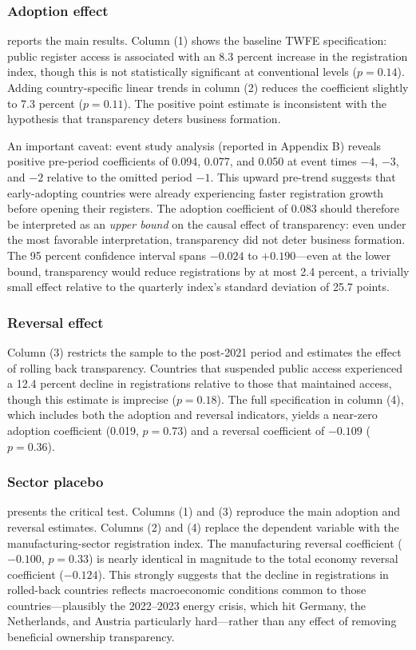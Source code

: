 \documentclass[12pt]{article}
\begin{document}


\subsubsection*{Adoption effect}  reports the main results. Column (1) shows the baseline TWFE specification: public register access is associated with an 8.3 percent increase in the registration index, though this is not statistically significant at conventional levels ($p = 0.14$). Adding country-specific linear trends in column (2) reduces the coefficient slightly to 7.3 percent ($p = 0.11$). The positive point estimate is inconsistent with the hypothesis that transparency deters business formation.

An important caveat: event study analysis (reported in Appendix B) reveals positive pre-period coefficients of 0.094, 0.077, and 0.050 at event times $-4$, $-3$, and $-2$ relative to the omitted period $-1$. This upward pre-trend suggests that early-adopting countries were already experiencing faster registration growth before opening their registers. The adoption coefficient of 0.083 should therefore be interpreted as an \textit{upper bound} on the causal effect of transparency: even under the most favorable interpretation, transparency did not deter business formation. The 95 percent confidence interval spans $-0.024$ to $+0.190$---even at the lower bound, transparency would reduce registrations by at most 2.4 percent, a trivially small effect relative to the quarterly index's standard deviation of 25.7 points.

\subsubsection*{Reversal effect} Column (3) restricts the sample to the post-2021 period and estimates the effect of rolling back transparency. Countries that suspended public access experienced a 12.4 percent decline in registrations relative to those that maintained access, though this estimate is imprecise ($p = 0.18$). The full specification in column (4), which includes both the adoption and reversal indicators, yields a near-zero adoption coefficient (0.019, $p = 0.73$) and a reversal coefficient of $-0.109$ ($p = 0.36$).

\subsubsection*{Sector placebo}  presents the critical test. Columns (1) and (3) reproduce the main adoption and reversal estimates. Columns (2) and (4) replace the dependent variable with the manufacturing-sector registration index. The manufacturing reversal coefficient ($-0.100$, $p = 0.33$) is nearly identical in magnitude to the total economy reversal coefficient ($-0.124$). This strongly suggests that the decline in registrations in rolled-back countries reflects macroeconomic conditions common to those countries---plausibly the 2022--2023 energy crisis, which hit Germany, the Netherlands, and Austria particularly hard---rather than any effect of removing beneficial ownership transparency.
\end{document}
